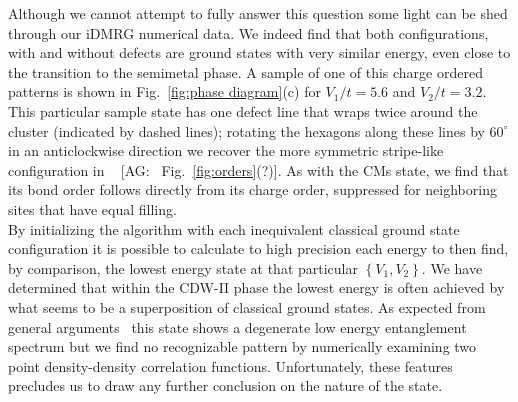 \documentclass[aps,prx,10pt,twocolumn,floatfix,superscriptaddress,showpacs,numerical,footinbib]{revtex4-1}
\newcommand{\noteAG}[1]{{\color{blue} [AG: #1]}}
\begin{document}
Although we cannot attempt to fully answer this question some light can be shed through our iDMRG numerical data. 
%
We indeed find that both configurations, with and without defects are ground states with very similar energy,
even close to the transition to the semimetal phase.
%
A sample of one of this charge ordered patterns is shown in Fig.~\ref{fig:phase diagram}(c) for $V_{1}/t=5.6$ and $V_{2}/t=3.2$.
%
This particular sample state has one defect line that wraps twice around the cluster (indicated by dashed lines); rotating the hexagons along these
lines by $60^{\circ}$ in an anticlockwise direction we recover the more symmetric stripe-like configuration in ~\noteAG{~Fig.~\ref{fig:orders}(?)}.
%
As with the CMs state, we find that its bond order follows directly from its charge order, suppressed for neighboring sites that have
equal filling.\\
%
By initializing the algorithm with each inequivalent classical ground state configuration it is possible to calculate to high precision each 
energy to then find, by comparison, the lowest energy state at that particular $\left\lbrace V_{1},V_{2}\right\rbrace$.
%
We have determined that within the CDW-II phase the lowest energy is often achieved by what seems to be 
a superposition of classical ground states.
%
As expected from general arguments~\cite{KZM13} this state shows a degenerate low energy entanglement spectrum but we find no 
recognizable pattern by numerically examining two point density-density correlation functions.
%
Unfortunately, these features precludes us to draw any further conclusion on the nature of the state.
%

%
%
\end{document}

